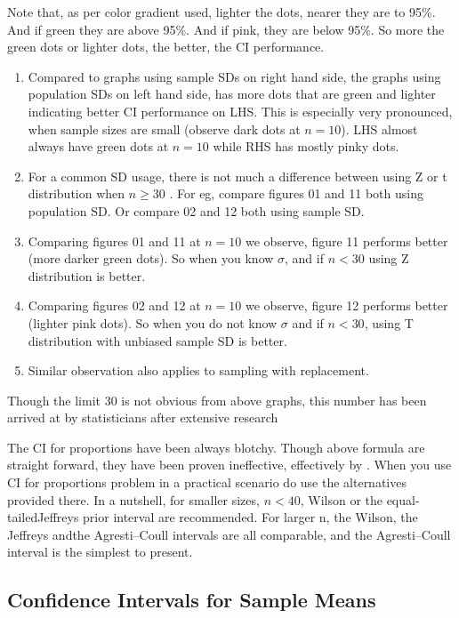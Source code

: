\documentclass[float=false,crop=false]{standalone}
\begin{document}
    Note that, as per color gradient used, lighter the dots, nearer they are
to 95\%. And if green they are above 95\%. And if pink, they are below
95\%. So more the green dots or lighter dots, the better, the CI
performance.

\begin{enumerate}
\def\labelenumi{\arabic{enumi}.}
\tightlist
\item
  Compared to graphs using sample SDs on right hand side, the graphs
  using population SDs on left hand side, has more dots that are green
  and lighter indicating better CI performance on LHS. This is
  especially very pronounced, when sample sizes are small (observe dark
  dots at \(n=10\)). LHS almost always have green dots at \(n=10\) while
  RHS has mostly pinky dots.
\item
  For a common SD usage, there is not much a difference between using Z
  or t distribution when \(n \geq 30\) . For eg, compare figures 01 and
  11 both using population SD. Or compare 02 and 12 both using sample
  SD.
\item
  Comparing figures 01 and 11 at \(n=10\) we observe, figure 11 performs
  better (more darker green dots). So when you know \(\sigma\), and if
  \(n < 30\) using Z distribution is better.
\item
  Comparing figures 02 and 12 at \(n=10\) we observe, figure 12 performs
  better (lighter pink dots). So when you do not know \(\sigma\) and if
  \(n < 30\), using T distribution with unbiased sample SD is better.
\item
  Similar observation also applies to sampling with replacement.
\end{enumerate}

Though the limit 30 is not obvious from above graphs, this number has
been arrived at by statisticians after extensive research
\begin{tcolorbox}[colback=green!5,colframe=green!40!black,title=Warning]
The CI for proportions have been always blotchy. Though above formula are straight forward, they have been proven ineffective, effectively by \citet{dasgupta2001}. When you use CI for proportions problem in a practical scenario do use the alternatives provided there. In a nutshell, for smaller sizes, $n < 40$, Wilson
or the equal-tailedJeffreys prior interval are recommended. For larger n, the Wilson, the Jeffreys andthe Agresti–Coull intervals are all comparable, and the Agresti–Coull interval is the simplest to present. 
\end{tcolorbox}
    \subsection{Confidence Intervals for Sample
Means}\label{confidence-intervals-for-sample-means}
\end{document}
